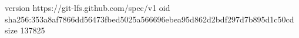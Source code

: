 version https://git-lfs.github.com/spec/v1
oid sha256:353a8af7866dd56473fbed5025a566696ebea95d862d2bdf297d7b895d1c50cd
size 137825
